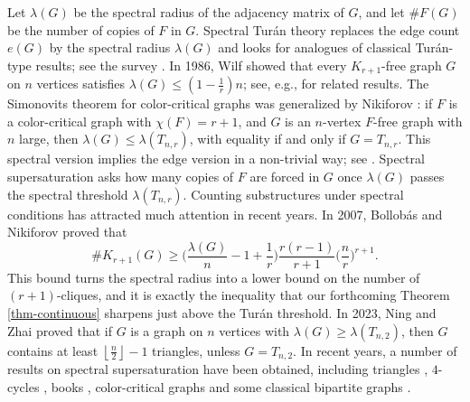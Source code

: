 \documentclass[11pt,a4paper]{article}
\theoremstyle{definition}
\theoremstyle{plain}
\renewcommand{\le}{\leqslant}
\renewcommand{\ge}{\geqslant}
\begin{document}
Let $\lambda(G)$ be the spectral radius of the adjacency matrix of $G$, and let $\texttt{\#}F (G)$ be the number of copies of $F$ in $G$. 
Spectral Tur\'{a}n theory 
replaces the edge count $e(G)$ by the
spectral radius $\lambda(G)$ and looks for analogues of classical
Tur\'an-type results; see the survey  \cite{Nik2011survey}. 
In 1986, Wilf \cite{Wil1986} showed that every $K_{r+1}$-free graph $G$ on $n$ vertices satisfies $\lambda (G) \le (1- \frac{1}{r})n$; see, e.g., \cite{Niki2009cpc, Niki2009jgt, KN2014} for related results.  
The Simonovits theorem for color-critical graphs was generalized by Nikiforov \cite{Nik2009EJC}: if $F$ is a color-critical graph with $\chi(F)=r+1$, and
$G$ is an $n$-vertex $F$-free graph with $n$ large, then
$\lambda(G)\le\lambda(T_{n,r})$, 
with equality if and only if $G=T_{n,r}$. This spectral version implies the edge version in a non-trivial way; see  \cite{LiuNing2026}. 
Spectral supersaturation asks how many copies of $F$ are forced in $G$ once
$\lambda(G)$ passes the spectral threshold $\lambda(T_{n,r})$.  
Counting substructures under spectral conditions
has attracted much attention in recent years. 
 In 2007, 
Bollob\'{a}s 
and Nikiforov \cite{BN2007jctb} proved that   
\begin{equation} \label{eq-BN}
\texttt{\#}K_{r+1}(G) \ge \Big( \frac{\lambda (G)}{n} - 1 + \frac{1}{r} \Big) 
\frac{r(r-1)}{r+1} \Big( \frac{n}{r}\Big)^{r+1}. 
\end{equation}
This bound turns the spectral radius into a lower bound on the number of
$(r+1)$-cliques, and it is exactly the inequality that
our forthcoming Theorem \ref{thm-continuous} sharpens just above the Tur\'an threshold. 
In 2023, Ning and Zhai \cite{NZ2021} proved that if $G$ is a graph on $n$ vertices with  $\lambda (G) \ge \lambda (T_{n,2})$, 
then $G$ contains at least 
$\left\lfloor \frac{n}{2}\right\rfloor -1$ triangles, 
unless $G=T_{n,2}$.   
In recent years, a number of results on spectral
supersaturation have been obtained, 
including triangles \cite{LFP2024, ZZ2026, CLT2026},  
$4$-cycles \cite{NZ2021b,LLZ2024-book-4-cycle},
 books \cite{ZL2022jgt, ZLL2026, ZYZZ2026, WLS2026},  
 color-critical graphs \cite{FLLM2025, FLZ2026, FLZ2026-tripartite, CL2026} 
and some classical bipartite graphs \cite{LLZ2026-Spec-Sido}.  
\end{document}
